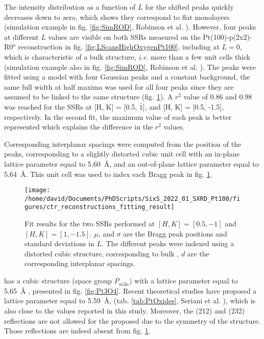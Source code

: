 The intensity distribution as a function of $L$ for the shifted peaks quickly decreases down to zero, which shows they correspond to flat monolayers (simulation example in fig. \ref{fig:SimROD}, Robinson et al. \cite*{Robinson1991}).
However, four peaks at different $L$ values are visible on both SSRs measured on the Pt(100)-p(2x2)-R\ang{0} reconstruction in fig. \ref{fig:LScansHighOxygenPt100}, including at $L=0$, which is characteristic of a bulk structure, \textit{i.e.} more than a few unit cells thick (simulation example also in fig. \ref{fig:SimROD}, Robinson et al. \cite*{Robinson1991}).
The peaks were fitted using a model with four Gaussian peaks and a constant background, the same full width at half maxima was used for all four peaks since they are assumed to be linked to the same structure (fig. \ref{fig:FitPt100LScans}).
A $r^2$ value of \num{0.86} and \num{0.98} was reached for the SSRs at [H, K] = [0.5, $\bar{1}$], and [H, K] = [0.5, -1.5], respectively.
In the second fit, the maximum value of each peak is better represented which explains the difference in the $r^2$ values.

Corresponding interplanar spacings were computed from the position of the peaks, corresponding to a slightly distorted cubic unit cell with an in-plane lattice parameter equal to \qty{5.60}{\angstrom}, and an out-of-plane lattice parameter equal to \qty{5.64}{\angstrom}.
This unit cell was used to index each Bragg peak in fig. \ref{fig:FitPt100LScans}.

\begin{figure}[!htb]
    \centering
    \texttt{[image: /home/david/Documents/PhDScripts/SixS\_2022\_01\_SXRD\_Pt100/figures/ctr\_reconstructions\_fitting\_result]}
    \caption{
        Fit results for the two SSRs performed at $[H, K] = [0.5, -1]$ and $[H, K] = [1, -1.5]$.
        $\mu$, and $\sigma$ are the Bragg peak positions and standard deviations in $L$.
        The different peaks were indexed using a distorted cubic structure, corresponding to bulk , $d$ are the corresponding interplanar spacings.
    }
    \label{fig:FitPt100LScans}
\end{figure}

 has a cubic structure (space group $P_{m\bar{3}n}$) with a lattice parameter equal to \qty{5.65}{\angstrom} \parencite{Galloni1941, Galloni1952, Muller1968}, presented in fig. \ref{fig:Pt3O4}.
Recent theoretical studies have proposed a lattice parameter equal to \qty{5.59}{\angstrom}, (tab. \ref{tab:PtOxides}, Seriani et al. \cite*{Seriani2006}), which is also close to the values reported in this study.
Moreover, the (212) and (232) reflections are not allowed for the proposed due to the symmetry of the  structure.
Those reflections are indeed absent from fig. \ref{fig:FitPt100LScans}.

